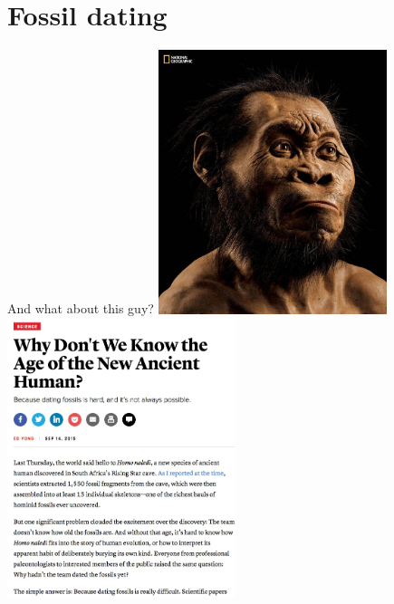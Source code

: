 \section{Fossil dating}

\begin{frame}{And what about this guy?}
\includegraphics[width=0.5\textwidth]{Homo_naledi.jpg}
\includegraphics[width=0.5\textwidth]{Atlantic_Homo_naledi.jpg}

\bigskip{}



\end{frame}

